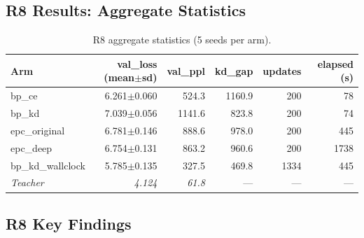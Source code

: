 \documentclass[11pt,a4paper]{article}
\begin{document}
\subsection{R8 Results: Aggregate Statistics}

\begin{table}[h]
\centering
\begin{tabular}{lrrrrr}
\toprule
\textbf{Arm} & \textbf{val\_loss} (mean$\pm$sd) & \textbf{val\_ppl} & \textbf{kd\_gap} & \textbf{updates} & \textbf{elapsed (s)} \\
\midrule
bp\_ce & 6.261$\pm$0.060 & 524.3 & 1160.9 & 200 & 78 \\
bp\_kd & 7.039$\pm$0.056 & 1141.6 & 823.8 & 200 & 74 \\
epc\_original & 6.781$\pm$0.146 & 888.6 & 978.0 & 200 & 445 \\
epc\_deep & 6.754$\pm$0.131 & 863.2 & 960.6 & 200 & 1738 \\
bp\_kd\_wallclock & 5.785$\pm$0.135 & 327.5 & 469.8 & 1334 & 445 \\
\midrule
\textit{Teacher} & \textit{4.124} & \textit{61.8} & --- & --- & --- \\
\bottomrule
\end{tabular}
\caption{R8 aggregate statistics (5 seeds per arm).}
\label{tab:r8-aggregate}
\end{table}

\subsection{R8 Key Findings}
\end{document}
